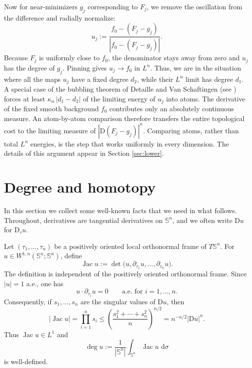 \documentclass[11pt,reqno]{amsart}
\numberwithin{equation}{section}
\newcommand{\Sph}{\mathbb S}
\newcommand{\D}{\mathrm D}
\newcommand{\dd}{\,\mathrm d}
\newcommand{\Jac}{\operatorname{Jac}}
\begin{document}
Now for near-minimizers $g_j$ corresponding to $F_j$, we remove the oscillation from the difference and radially normalize:
\[
  u_j:=\frac{f_0-(F_j-g_j)}{|f_0-(F_j-g_j)|}.
\]
Because $F_j$ is uniformly close to $f_0$, the denominator stays away from zero and $u_j$ has the degree of $g_j$.  Pinning gives $u_j\to f_0$ in $L^n$. Thus, we are in the situation where all the maps $u_j$ have a fixed degree $d_2$, while their $L^n$ limit has degree $d_1$. A special case of the bubbling theorem of Detaille and Van Schaftingen (see ) forces at least $\kappa_n \, |d_1-d_2|$ of the limiting energy of $u_j$ into atoms.  The derivative of the fixed smooth background $f_0$ contributes only an absolutely continuous measure.  An atom-by-atom comparison therefore transfers the entire topological cost to the limiting measure of $|\D(F_j-g_j)|^n$.  Comparing atoms, rather than total $L^n$ energies, is the step that works uniformly in every dimension. The details of this argument appear in Section \ref{sec:lower}.


\section{Degree and homotopy}\label{sec:preliminaries}

In this section we collect some well-known facts that we need in what follows. Throughout, derivatives are tangential derivatives on $\Sph^n$, and we often write $\D u$ for $\D_\tau u$.

Let $(\tau_1,\dots,\tau_n)$ be a positively oriented local orthonormal frame of $T\Sph^n$. For $u\in W^{1,n}(\Sph^n;\Sph^n)$, define
\begin{equation}\label{eq:weak-jac}
  \Jac u:=\det\bigl(u,\partial_{\tau_1}u,\dots,\partial_{\tau_n}u\bigr).
\end{equation}
The definition is independent of the positively oriented orthonormal frame. Since $|u|=1$ a.e., one has
\[
  u\cdot\partial_{\tau_i}u=0
  \qquad\text{a.e. for }i=1,\dots,n.
\]
Consequently, if $s_1,\dots,s_n$ are the singular values of $\D u$, then
\begin{equation}
    \label{eq:jacobianbound}
      |\Jac u|=\prod_{i=1}^n s_i
  \le\left(\frac{s_1^2+\cdots+s_n^2}{n}\right)^{n/2}
  =n^{-n/2}|\D u|^n.
\end{equation}
Thus $\Jac u\in L^1$ and
\begin{equation}\label{eq:degree-def}
  \deg u:=\frac1{|\Sph^n|}\int_{\Sph^n}\Jac u\,\dd\sigma
\end{equation}
is well-defined.
\end{document}
